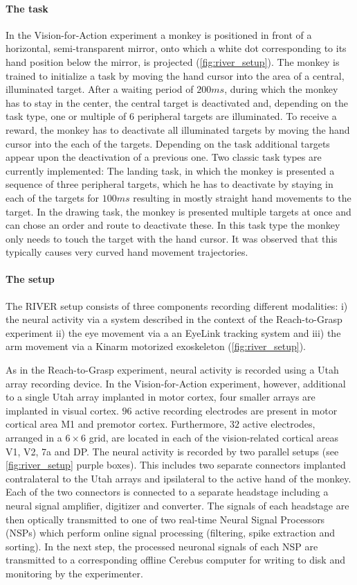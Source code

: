 \paragraph{The task}
In the Vision-for-Action experiment a monkey is positioned in front of a horizontal, semi-transparent mirror, onto which a white dot corresponding to its hand position below the mirror, is projected (\cref{fig:river_setup}). The monkey is trained to initialize a task by moving the hand cursor into the area of a central, illuminated target. After a waiting period of $200ms$, during which the monkey has to stay in the center, the central target is deactivated and, depending on the task type, one or multiple of 6 peripheral targets are illuminated. To receive a reward, the monkey has to deactivate all illuminated targets by moving the hand cursor into the each of the targets. Depending on the task additional targets appear upon the deactivation of a previous one. Two classic task types are currently implemented: The landing task, in which the monkey is presented a sequence of three peripheral targets, which he has to deactivate by staying in each of the targets for $100ms$ resulting in mostly straight hand movements to the target. In the drawing task, the monkey is presented multiple targets at once and can chose an order and route to deactivate these. In this task type the monkey only needs to touch the target with the hand cursor. It was observed that this typically causes very curved hand movement trajectories.


\paragraph{The setup}
The RIVER setup consists of three components recording different modalities: i) the neural activity via a  system described in the context of the Reach-to-Grasp experiment ii) the eye movement via a an EyeLink tracking system and iii) the arm movement via a Kinarm motorized exoskeleton (\cref{fig:river_setup}).

As in the Reach-to-Grasp experiment, neural activity is recorded using a Utah array recording device. In the Vision-for-Action experiment, however, additional to a single Utah array implanted in motor cortex, four smaller arrays are implanted in visual cortex.  $96$ active recording electrodes are present in motor cortical area M1 and premotor cortex. Furthermore, $32$ active electrodes, arranged in a $6\times6$ grid, are located in each of the vision-related cortical areas V1, V2, 7a and DP. The neural activity is recorded by two parallel setups (see \cref{fig:river_setup} purple boxes). This includes two separate connectors implanted contralateral to the Utah arrays and ipsilateral to the active hand of the monkey. Each of the two connectors is connected to a separate headstage including a neural signal amplifier, digitizer and converter. The signals of each headstage are then optically transmitted to one of two real-time Neural Signal Processors (NSPs) which perform online signal processing (filtering, spike extraction and sorting). In the next step, the processed neuronal signals of each NSP are transmitted to a corresponding offline Cerebus computer for writing to disk and monitoring by the experimenter.

